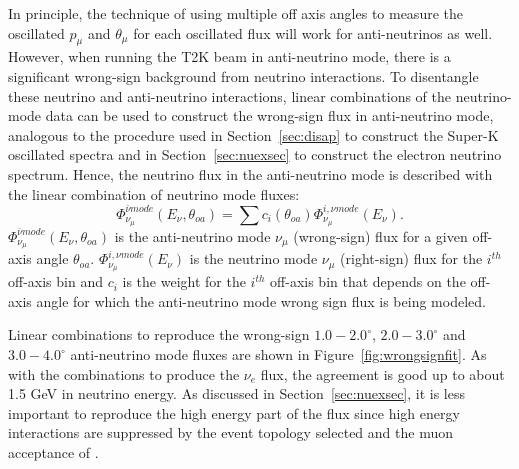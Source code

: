 In principle, the \nuprism technique of using multiple off axis angles to measure the oscillated $p_\mu$ and $\theta_\mu$ for each oscillated flux will work for anti-neutrinos as well. However, when running the T2K beam in anti-neutrino mode, there is a significant wrong-sign background from neutrino interactions. To disentangle these neutrino and anti-neutrino interactions, linear combinations of the neutrino-mode data can be used to construct the wrong-sign flux in anti-neutrino mode, analogous to the procedure used in Section~\ref{sec:disap} to construct the Super-K oscillated spectra and in Section~\ref{sec:nuexsec} to construct the electron neutrino spectrum. Hence, the neutrino flux in the anti-neutrino mode is described with the linear combination of neutrino mode fluxes:
\begin{equation}
\Phi^{\bar{\nu}mode}_{\nu_{\mu}}(E_{\nu},\theta_{oa}) = \sum c_i(\theta_{oa}) \Phi^{i,\nu mode}_{\nu_\mu}(E_\nu).
\end{equation}
$\Phi^{\bar{\nu}mode}_{\nu_{\mu}}(E_{\nu},\theta_{oa})$ is the anti-neutrino mode $\nu_{\mu}$ (wrong-sign) flux for a given off-axis angle $\theta_{oa}$.    $\Phi^{i,\nu mode}_{\nu_\mu}(E_\nu)$ is the neutrino mode $\nu_{\mu}$ (right-sign) flux for the $i^{th}$ off-axis bin and $c_i$ is the weight for the $i^{th}$ off-axis bin that depends on the off-axis angle for which the anti-neutrino mode wrong sign flux is being modeled.  

Linear combinations to reproduce the wrong-sign $1.0-2.0^{\circ}$, $2.0-3.0^{\circ}$ and $3.0-4.0^{\circ}$ anti-neutrino mode fluxes are shown in Figure~\ref{fig:wrongsignfit}.  As with the combinations to produce the $\nu_{e}$ flux, the agreement is good up to about 1.5 GeV in neutrino energy.  As discussed in Section~\ref{sec:nuexsec}, it is less important to reproduce the high energy part of the flux since high energy interactions are suppressed by the event topology selected and the muon acceptance of \nuprism.

